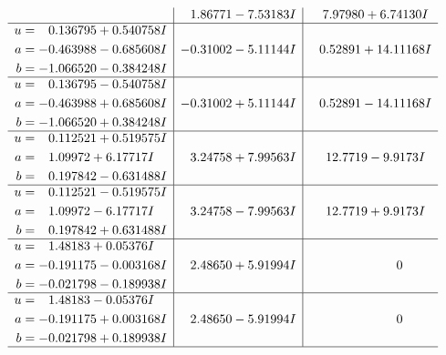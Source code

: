 \documentclass[1p]{elsarticle_modified}
\theoremstyle{definition}
\begin{document}
$$\begin{array}{c|c|c}
 & \phantom{-}1.86771 - 7.53183 I & \phantom{-}7.97980 + 6.74130 I \\ \hline\begin{aligned}
u &= \phantom{-}0.136795 + 0.540758 I \\
a &= -0.463988 - 0.685608 I \\
b &= -1.066520 - 0.384248 I\end{aligned}
 & -0.31002 - 5.11144 I & \phantom{-}0.52891 + 14.11168 I \\ \hline\begin{aligned}
u &= \phantom{-}0.136795 - 0.540758 I \\
a &= -0.463988 + 0.685608 I \\
b &= -1.066520 + 0.384248 I\end{aligned}
 & -0.31002 + 5.11144 I & \phantom{-}0.52891 - 14.11168 I \\ \hline\begin{aligned}
u &= \phantom{-}0.112521 + 0.519575 I \\
a &= \phantom{-}1.09972 + 6.17717 I \\
b &= \phantom{-}0.197842 - 0.631488 I\end{aligned}
 & \phantom{-}3.24758 + 7.99563 I & \phantom{-}12.7719 - 9.9173 I \\ \hline\begin{aligned}
u &= \phantom{-}0.112521 - 0.519575 I \\
a &= \phantom{-}1.09972 - 6.17717 I \\
b &= \phantom{-}0.197842 + 0.631488 I\end{aligned}
 & \phantom{-}3.24758 - 7.99563 I & \phantom{-}12.7719 + 9.9173 I \\ \hline\begin{aligned}
u &= \phantom{-}1.48183 + 0.05376 I \\
a &= -0.191175 - 0.003168 I \\
b &= -0.021798 - 0.189938 I\end{aligned}
 & \phantom{-}2.48650 + 5.91994 I & \phantom{-0.000000 } 0 \\ \hline\begin{aligned}
u &= \phantom{-}1.48183 - 0.05376 I \\
a &= -0.191175 + 0.003168 I \\
b &= -0.021798 + 0.189938 I\end{aligned}
 & \phantom{-}2.48650 - 5.91994 I & \phantom{-0.000000 } 0\\
 \hline 
 \end{array}$$\newpage$$\begin{array}{c|c|c}  

\end{array}$$
\end{document}
